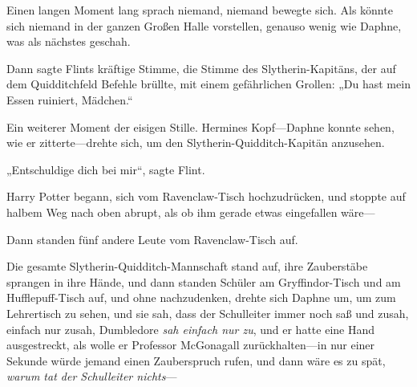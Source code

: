 Einen langen Moment lang sprach niemand, niemand bewegte sich. Als könnte sich niemand in der ganzen Großen Halle vorstellen, genauso wenig wie Daphne, was als nächstes geschah.

Dann sagte Flints kräftige Stimme, die Stimme des Slytherin-Kapitäns, der auf dem Quidditchfeld Befehle brüllte, mit einem gefährlichen Grollen: „Du hast mein Essen ruiniert, Mädchen.“

Ein weiterer Moment der eisigen Stille. Hermines Kopf—Daphne konnte sehen, wie er zitterte—drehte sich, um den Slytherin-Quidditch-Kapitän anzusehen.

„Entschuldige dich bei mir“, sagte Flint.

Harry Potter begann, sich vom Ravenclaw-Tisch hochzudrücken, und stoppte auf halbem Weg nach oben abrupt, als ob ihm gerade etwas eingefallen wäre—

Dann standen fünf andere Leute vom Ravenclaw-Tisch auf.

Die gesamte Slytherin-Quidditch-Mannschaft stand auf, ihre Zauberstäbe sprangen in ihre Hände, und dann standen Schüler am Gryffindor-Tisch und am Hufflepuff-Tisch auf, und ohne nachzudenken, drehte sich Daphne um, um zum Lehrertisch zu sehen, und sie sah, dass der Schulleiter immer noch saß und zusah, einfach nur zusah, Dumbledore \emph{sah einfach nur zu}, und er hatte eine Hand ausgestreckt, als wolle er Professor McGonagall zurückhalten—in nur einer Sekunde würde jemand einen Zauberspruch rufen, und dann wäre es zu spät, \emph{warum tat der Schulleiter nichts}—

